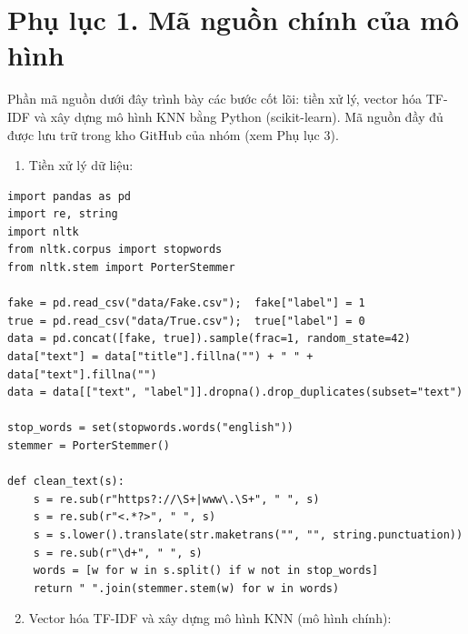 \appendix
{}

\section*{Phụ lục 1. Mã nguồn chính của mô hình}

Phần mã nguồn dưới đây trình bày các bước cốt lõi: tiền xử lý, vector hóa TF-IDF và xây dựng mô hình KNN bằng Python (scikit-learn). Mã nguồn đầy đủ được lưu trữ trong kho GitHub của nhóm (xem Phụ lục 3).

\begin{enumerate}
    \item Tiền xử lý dữ liệu:
\end{enumerate}

{\small
\begin{verbatim}
import pandas as pd
import re, string
import nltk
from nltk.corpus import stopwords
from nltk.stem import PorterStemmer

fake = pd.read_csv("data/Fake.csv");  fake["label"] = 1
true = pd.read_csv("data/True.csv");  true["label"] = 0
data = pd.concat([fake, true]).sample(frac=1, random_state=42)
data["text"] = data["title"].fillna("") + " " + data["text"].fillna("")
data = data[["text", "label"]].dropna().drop_duplicates(subset="text")

stop_words = set(stopwords.words("english"))
stemmer = PorterStemmer()

def clean_text(s):
    s = re.sub(r"https?://\S+|www\.\S+", " ", s)
    s = re.sub(r"<.*?>", " ", s)
    s = s.lower().translate(str.maketrans("", "", string.punctuation))
    s = re.sub(r"\d+", " ", s)
    words = [w for w in s.split() if w not in stop_words]
    return " ".join(stemmer.stem(w) for w in words)
\end{verbatim}
}

\begin{enumerate}
    \setcounter{enumi}{1}
    \item Vector hóa TF-IDF và xây dựng mô hình KNN (mô hình chính):
\end{enumerate}

